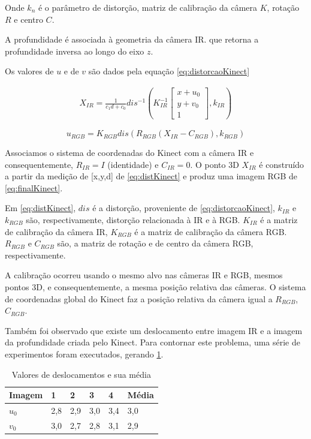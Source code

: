 Onde $k_n$ é o parâmetro de distorção, matriz de calibração da câmera $K$, rotação $R$ e centro $C$.

A profundidade é associada à geometria da câmera IR. que retorna a profundidade inversa ao longo do eixo $z$.

Os valores de $u$ e de $v$ são dados pela equação \ref{eq:distorcaoKinect} %

\begin{gather} 
X_{IR} = \frac{1}{c_1 d + c_0}dis^{-1}\left ( K^{-1}_{IR}
\begin{bmatrix}
x+u_0\\ 
y+v_0\\ 
1
\end{bmatrix},k_{IR} 
\right )
\label{eq:distKinect}
\end{gather}

\begin{equation}
\label{eq:finalKinect}
u_{RGB} = K_{RGB} dis(R_{RGB}(X_{IR} - C_{RGB}),k_{RGB})
\end{equation}

Associamos o sistema de coordenadas do Kinect com a câmera IR e consequentemente, $R_{IR} = I$ (identidade) e $C_{IR} = 0$. 
O ponto 3D $X_{IR}$ é construído a partir da medição de [x,y,d] de \ref{eq:distKinect} e produz uma imagem RGB de \ref{eq:finalKinect}.

Em \ref{eq:distKinect}, $dis$ é a distorção, proveniente de \ref{eq:distorcaoKinect}, $k_{IR}$ e $k_{RGB}$ são, respectivamente, distorção relacionada à IR e à RGB. 
$K_{IR}$ é a matriz de calibração da câmera IR, $K_{RGB}$ é a matriz de calibração da câmera RGB. $R_{RGB}$ e $C_{RGB}$ são, a matriz de rotação e de centro da câmera RGB, respectivamente.

A calibração ocorreu usando o mesmo alvo nas câmeras IR e RGB, mesmos pontos 3D, e consequentemente, a mesma posição relativa das câmeras.
O sistema de coordenadas global do Kinect faz a posição relativa da câmera igual a $R_{RGB}$, $C_{RGB}$.

Também foi observado que existe um deslocamento entre imagem IR e a imagem da profundidade criada pelo Kinect. Para contornar este problema, uma série de experimentos foram executados, gerando \ref{tab:deslocamentoKinect}.

\begin{table}[!h]
\centering
\caption{Valores de deslocamentos e sua média}
\label{tab:deslocamentoKinect}
\begin{tabular}{|l|l|l|l|l|l|}
\hline
Imagem & 1   & 2   & 3   & 4   & Média \\ \hline
$u_0$  & 2,8 & 2,9 & 3,0 & 3,4 & 3,0   \\ \hline
$v_0$  & 3,0 & 2,7 & 2,8 & 3,1 & 2,9   \\ \hline
\end{tabular}
\end{table}

